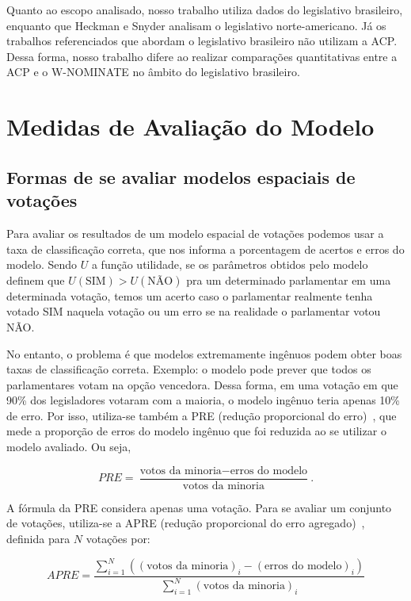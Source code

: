 \documentclass[
	article,			%
	12pt,				%
    twoside,			%
	a4paper,			%
	english,			%
	french,				%
	spanish,			%
	brazil,				%
	]{abntex2}
\newcommand\nay{NÃO\xspace}
\newcommand\yea{SIM\xspace}
\newcommand\wnominate{W-NOMINATE\xspace}
\begin{document}
Quanto ao escopo analisado, nosso trabalho utiliza dados do legislativo brasileiro, enquanto que Heckman e Snyder analisam o legislativo norte-americano. Já os trabalhos referenciados que abordam o legislativo brasileiro não utilizam a ACP. Dessa forma, nosso trabalho difere ao realizar comparações quantitativas entre a ACP e o \wnominate no âmbito do legislativo brasileiro.

\section{Medidas de Avaliação do Modelo}
\label{sec:avaliacao}

\subsection{Formas de se avaliar modelos espaciais de votações}

Para avaliar os resultados de um modelo espacial de votações podemos usar a taxa de classificação correta, que nos informa a porcentagem de acertos e erros do modelo. Sendo $U$ a função utilidade, se os parâmetros obtidos pelo modelo definem que $U(\textrm{SIM}) > U(\textrm{NÃO})$ pra um determinado parlamentar em uma determinada votação, temos um acerto caso o parlamentar realmente tenha votado \yea naquela votação ou um erro se na realidade o parlamentar votou \nay.

No entanto, o problema é que modelos extremamente ingênuos podem obter boas taxas de classificação correta. Exemplo: o modelo pode prever que todos os parlamentares votam na opção vencedora. Dessa forma, em uma votação em que 90\% dos legisladores votaram com a maioria, o modelo ingênuo teria apenas 10\% de erro. Por isso, utiliza-se também a PRE (redução proporcional do erro)~\cite{leoni02cdep}, que mede a proporção de erros do modelo ingênuo que foi reduzida ao se utilizar o modelo avaliado. Ou seja,

\[PRE = \frac{\textrm{votos da minoria} - \textrm{erros do modelo}}{\textrm{votos da minoria}}.\]

A fórmula da PRE considera apenas uma votação. Para se avaliar um conjunto de votações, utiliza-se a APRE (redução proporcional do erro agregado)~\cite{leoni02cdep}, definida para $N$ votações por:

\[APRE = \frac{\sum_{i=1}^{N}\left(\left(\textrm{votos da minoria}\right)_i-\left(\textrm{erros do modelo}\right)_i\right)}{\sum_{i=1}^{N}\left(\textrm{votos da minoria}\right)_i}\]
\end{document}
